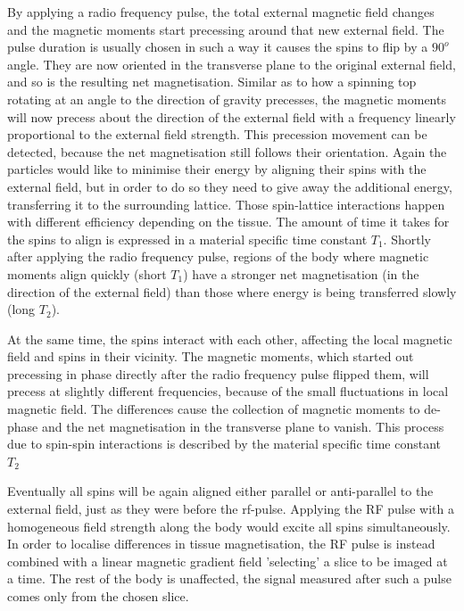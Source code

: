 By applying a radio frequency pulse, the total external magnetic field changes and the magnetic moments start precessing around that new external field.
The pulse duration is usually chosen in such a way it causes the spins to flip by a $90^o$ angle.
They are now oriented in the transverse plane to the original external field, and so is the resulting net magnetisation.
Similar as to how a spinning top rotating at an angle to the direction of gravity precesses, the magnetic moments will now precess about the direction of the external field with a frequency linearly proportional to the external field strength.
This precession movement can be detected, because the net magnetisation still follows their orientation. 
Again the particles would like to minimise their energy by aligning their spins with the external field, but in order to do so they need to give away the additional energy, transferring it to the surrounding lattice.
Those spin-lattice interactions happen with different efficiency depending on the tissue.
The amount of time it takes for the spins to align is expressed in a material specific time constant $T_1$.
Shortly after applying the radio frequency pulse, regions of the body where magnetic moments align quickly (short $T_1$) have a stronger net magnetisation (in the direction of the external field) than those where energy is being transferred slowly (long $T_2$).

At the same time, the spins interact with each other, affecting the local magnetic field and spins in their vicinity.
The magnetic moments, which started out precessing in phase directly after the radio frequency pulse flipped them, will precess at slightly different frequencies, because of the small fluctuations in local magnetic field.
The differences cause the collection of magnetic moments to de-phase and the net magnetisation in the transverse plane to vanish.
This process due to spin-spin interactions is described by the material specific time constant $T_2$

Eventually all spins will be again aligned either parallel or anti-parallel to the external field, just as they were before the rf-pulse. 
Applying the RF pulse with a homogeneous field strength along the body would excite all spins simultaneously.
In order to localise differences in tissue magnetisation, the RF pulse is instead combined with a linear magnetic gradient field 'selecting' a slice to be imaged at a time.
The rest of the body is unaffected, the signal measured after such a pulse comes only from the chosen slice.

